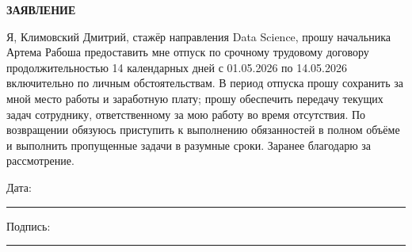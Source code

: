 \documentclass[12pt]{article}
\begin{document}
\begin{center}
\textbf{\LARGE ЗАЯВЛЕНИЕ}
\end{center}

\vspace{1cm}



Я, Климовский Дмитрий, стажёр направления Data Science, прошу начальника Артема Рабоша предоставить мне отпуск по срочному трудовому договору продолжительностью 14 календарных дней с 01.05.2026 по 14.05.2026 включительно по личным обстоятельствам. В период отпуска прошу сохранить за мной место работы и заработную плату; прошу обеспечить передачу текущих задач сотруднику, ответственному за мою работу во время отсутствия. По возвращении обязуюсь приступить к выполнению обязанностей в полном объёме и выполнить пропущенные задачи в разумные сроки. Заранее благодарю за рассмотрение.

\vfill

\noindent
Дата: \rule{5cm}{0.4pt} \hfill Подпись: \rule{5cm}{0.4pt}
\end{document}
